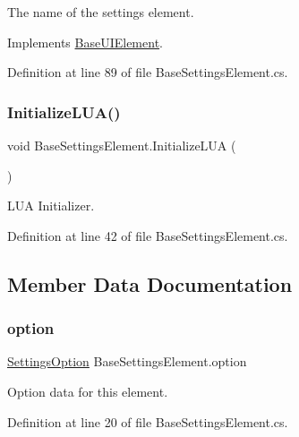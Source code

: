 The name of the settings element. 



Implements \hyperlink{class_base_u_i_element_acb7fcd49138477941f2e43733ad9d34d}{Base\+U\+I\+Element}.



Definition at line 89 of file Base\+Settings\+Element.\+cs.

\mbox{\label{class_base_settings_element_af2b10653291d4617dea28ee26e1c1c6c}} 
\subsubsection{\texorpdfstring{Initialize\+L\+U\+A()}{InitializeLUA()}}
{\footnotesize\ttfamily void Base\+Settings\+Element.\+Initialize\+L\+UA (\begin{DoxyParamCaption}{ }\end{DoxyParamCaption})}



L\+UA Initializer. 



Definition at line 42 of file Base\+Settings\+Element.\+cs.



\subsection{Member Data Documentation}
\mbox{\label{class_base_settings_element_a2c1c435ddeb8bba562b2eaed7de48f9a}} 
\subsubsection{\texorpdfstring{option}{option}}
{\footnotesize\ttfamily \hyperlink{struct_settings_option}{Settings\+Option} Base\+Settings\+Element.\+option}



Option data for this element. 



Definition at line 20 of file Base\+Settings\+Element.\+cs.

